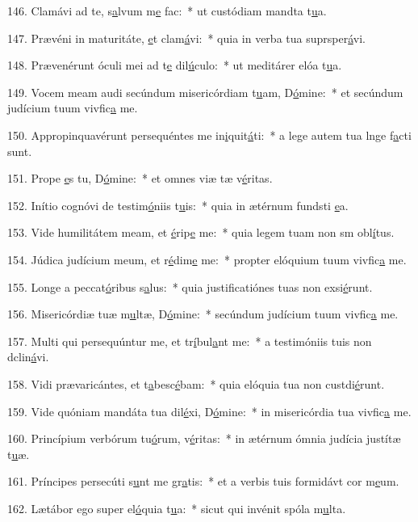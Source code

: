 146. Clamávi ad te, s\uline{a}lvum m\uline{e} fac:~* ut custódiam mandta t\uline{u}a.\par 
147. Prævéni in maturitáte, \uline{e}t clam\uline{á}vi:~* quia in verba tua suprsper\uline{á}vi.\par 
148. Prævenérunt óculi mei ad t\uline{e} dil\uline{ú}culo:~* ut meditárer elóa t\uline{u}a.\par 
149. Vocem meam audi secúndum misericórdiam t\uline{u}am, D\uline{ó}mine:~* et secúndum judícium tuum vivfic\uline{a} me.\par 
150. Appropinquavérunt persequéntes me in\uline{i}quit\uline{á}ti:~* a lege autem tua lnge f\uline{a}cti sunt.\par 
151. Prope \uline{e}s tu, D\uline{ó}mine:~* et omnes viæ tæ v\uline{é}ritas.\par 
152. Inítio cognóvi de testim\uline{ó}niis t\uline{u}is:~* quia in ætérnum fundsti \uline{e}a.\par 
153. Vide humilitátem meam, et \uline{é}rip\uline{e} me:~* quia legem tuam non sm obl\uline{í}tus.\par 
154. Júdica judícium meum, et r\uline{é}dim\uline{e} me:~* propter elóquium tuum vivfic\uline{a} me.\par 
155. Longe a peccat\uline{ó}ribus s\uline{a}lus:~* quia justificatiónes tuas non exsi\uline{é}runt.\par 
156. Misericórdiæ tuæ m\uline{u}ltæ, D\uline{ó}mine:~* secúndum judícium tuum vivfic\uline{a} me.\par 
157. Multi qui persequúntur me, et tr\uline{í}bul\uline{a}nt me:~* a testimóniis tuis non dclin\uline{á}vi.\par 
158. Vidi prævaricántes, et t\uline{a}besc\uline{é}bam:~* quia elóquia tua non custdi\uline{é}runt.\par 
159. Vide quóniam mandáta tua dil\uline{é}xi, D\uline{ó}mine:~* in misericórdia tua vivfic\uline{a} me.\par 
160. Princípium verbórum tu\uline{ó}rum, v\uline{é}ritas:~* in ætérnum ómnia judícia justítæ t\uline{u}æ.\par 
161. Príncipes persecúti s\uline{u}nt me gr\uline{a}tis:~* et a verbis tuis formidávt cor m\uline{e}um.\par 
162. Lætábor ego super el\uline{ó}quia t\uline{u}a:~* sicut qui invénit spóla m\uline{u}lta.\par 

